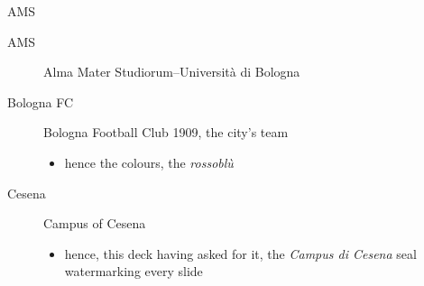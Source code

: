 \begin{frame}[c]{AMS}
%
\begin{description}
	\item[AMS] Alma Mater Studiorum--Università di Bologna
	\item[Bologna FC] Bologna Football Club 1909, the city's team
	\begin{itemize}
		\item hence the colours, the \textcolor{bolognafcred}{\textit{rosso}}\textcolor{bolognafcblue}{\textit{bl\`u}}
	\end{itemize}
	\item[Cesena] Campus of Cesena
	\begin{itemize}
		\item hence, this deck having asked for it, the \emph{Campus di Cesena} seal watermarking every slide
	\end{itemize}
\end{description}
%
\end{frame}

